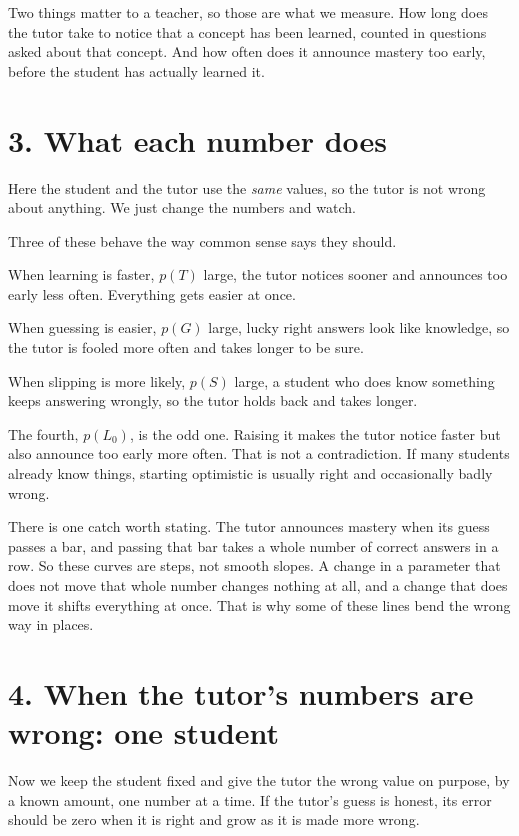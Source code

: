 \documentclass[11pt]{article}
\begin{document}
Two things matter to a teacher, so those are what we measure. How long
does the tutor take to notice that a concept has been learned, counted in
questions asked about that concept. And how often does it announce
mastery too early, before the student has actually learned it.

\section*{3. What each number does}

Here the student and the tutor use the \emph{same} values, so the tutor is
not wrong about anything. We just change the numbers and watch.



\noindent Three of these behave the way common sense says they should.

When learning is faster, $p(T)$ large, the tutor notices sooner and
announces too early less often. Everything gets easier at once.

When guessing is easier, $p(G)$ large, lucky right answers look like
knowledge, so the tutor is fooled more often and takes longer to be sure.

When slipping is more likely, $p(S)$ large, a student who does know
something keeps answering wrongly, so the tutor holds back and takes
longer.

The fourth, $p(L_0)$, is the odd one. Raising it makes the tutor notice
faster but also announce too early more often. That is not a contradiction.
If many students already know things, starting optimistic is usually right
and occasionally badly wrong.

There is one catch worth stating. The tutor announces mastery when its
guess passes a bar, and passing that bar takes a whole number of correct
answers in a row. So these curves are steps, not smooth slopes. A change
in a parameter that does not move that whole number changes nothing at
all, and a change that does move it shifts everything at once. That is why
some of these lines bend the wrong way in places.

\section*{4. When the tutor's numbers are wrong: one student}

Now we keep the student fixed and give the tutor the wrong value on
purpose, by a known amount, one number at a time. If the tutor's guess is
honest, its error should be zero when it is right and grow as it is made
more wrong.
\end{document}
